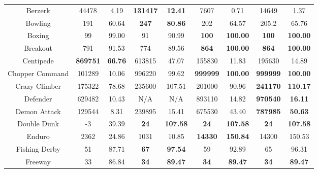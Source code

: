 \documentclass[nohyperref]{article}
\newcommand{\best}[1]{\textbf{#1}}
\theoremstyle{plain}
\begin{document}
\begin{table}[!hb]
\begin{center}
\begin{tabular}{| c | c c |c c |c c |c c |}
 Berzerk      &44478           &4.19             &\textbf{131417}      &\textbf{12.41 }                & 7607              &0.71          &14649             &1.37       \\
 Bowling      &191             &60.64        &\textbf{247}           &\textbf{80.86 }                & 202               &64.57            &205.2             &65.76 \\
 Boxing       &99              &99.00        &91                     &90.99                          & \best{100}        &\best{100.00}    &\textbf{100}      &\textbf{100.00}        \\
 Breakout     &791             &91.53          &774                    &89.56                          & \best{864}        &\best{100.00}  &\textbf{864}              &\textbf{100.00}       \\
 Centipede    &\textbf{869751} &\textbf{66.76}          &613815      &47.07                 & 155830            &11.83                    &195630            &14.89  \\
 Chopper Command &101289       &10.06       &996220                &99.62                          & \best{999999}     &\best{100.00}     &\textbf{999999}            &\textbf{100.00}    \\
 Crazy Climber   &175322       &78.68     &235600       &107.51                & 201000            &90.96               &\textbf{241170}            &\textbf{110.17}\\
 Defender        &629482       &10.43        &N/A                    &N/A                            & 893110     &14.82    &\textbf{970540}                &\textbf{16.11}      \\
 Demon Attack    &129544       &8.31        &239895                 &15.41                          & 675530     &43.40     &\textbf{787985}   &\textbf{50.63}    \\
 Double Dunk     &-3           &39.39       &\textbf{24}                     &\textbf{107.58}       & \best{24}       &\best{107.58}      &\textbf{24}      &\textbf{107.58}      \\
 Enduro          &2362         &24.86                   &1031                   &10.85              & \best{14330}      &\best{150.84}    &14300             &150.53        \\
 Fishing Derby   &51           &87.71       &\textbf{67}            &\textbf{97.54 }                & 59                &92.89            &65               &96.31\\
 Freeway         &33           &86.84                   &\textbf{34}            &\textbf{89.47 }    & \best{34}         &\best{89.47}     &\textbf{34}      &\textbf{89.47}      \\

\end{tabular}
\end{center}
\end{table}
\end{document}
